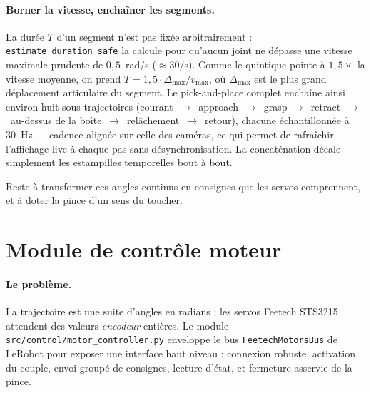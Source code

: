 \paragraph{Borner la vitesse, enchaîner les segments.} La durée $T$ d'un segment
n'est pas fixée arbitrairement : \texttt{estimate\_duration\_safe} la calcule pour
qu'aucun joint ne dépasse une vitesse maximale prudente de $0{,}5$~rad/s
($\approx 30$\textdegree/s). Comme le quintique pointe à $1{,}5\times$ la vitesse
moyenne, on prend $T = 1{,}5 \cdot \Delta_{\max} / v_{\max}$, où $\Delta_{\max}$
est le plus grand déplacement articulaire du segment. Le pick-and-place complet
enchaîne ainsi environ huit sous-trajectoires (courant~$\to$~approach~$\to$~grasp
$\to$~retract~$\to$~au-dessus de la boîte~$\to$~relâchement~$\to$~retour), chacune
échantillonnée à 30~Hz — cadence alignée sur celle des caméras, ce qui permet de
rafraîchir l'affichage live à chaque pas sans désynchronisation. La concaténation
décale simplement les estampilles temporelles bout à bout.

Reste à transformer ces angles continus en consignes que les servos comprennent,
et à doter la pince d'un sens du toucher.

\section{Module de contrôle moteur}
\label{sec:motor_control}

\paragraph{Le problème.} La trajectoire est une suite d'angles en radians ; les
servos Feetech STS3215 attendent des valeurs \emph{encodeur} entières. Le module
\texttt{src/control/motor\_controller.py} enveloppe le bus
\texttt{FeetechMotorsBus} de LeRobot pour exposer une interface haut niveau :
connexion robuste, activation du couple, envoi groupé de consignes, lecture
d'état, et fermeture asservie de la pince.

